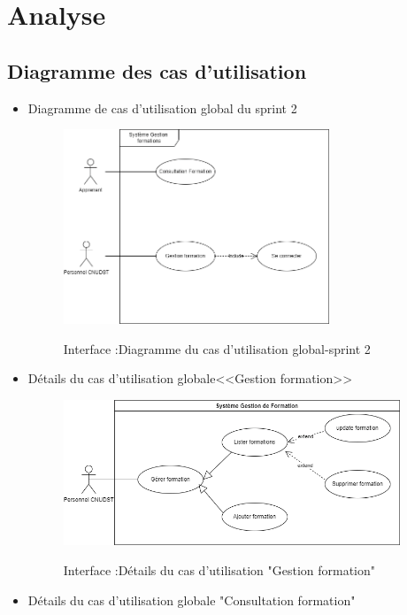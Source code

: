 \section{Analyse}
\subsection{Diagramme des cas d'utilisation}
\begin{itemize}
	\item Diagramme de cas d'utilisation global du sprint 2
	
	\begin{figure}[!h]
		\centering
		{\includegraphics[width=0.75\textwidth]{D) IMAGES/globalformation.png}}
		\caption{Interface :Diagramme du cas d'utilisation global-sprint 2 }
		\label{Org}
	\end{figure}
\newpage
	\item Détails du cas d'utilisation globale<<Gestion formation>>
	
	\begin{figure}[!h]
		\centering
		{\includegraphics[width=0.95\textwidth]{D) IMAGES/Gestform.png}}
		\caption{Interface :Détails du cas d'utilisation "Gestion formation" }
		\label{Org}
	\end{figure}
\item Détails du cas d'utilisation globale "Consultation formation"


\end{itemize}
